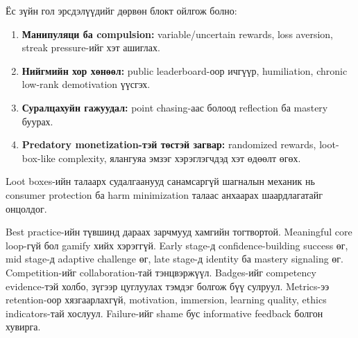 \begin{sloppy}
Ёс зүйн гол эрсдэлүүдийг дөрвөн блокт ойлгож болно:
\begin{enumerate}
  \item \textbf{Манипуляци ба compulsion:} variable/uncertain rewards, loss aversion, streak pressure-ийг хэт ашиглах.
  \item \textbf{Нийгмийн хор хөнөөл:} public leaderboard-оор ичгүүр, humiliation, chronic low-rank demotivation үүсгэх.
  \item \textbf{Суралцахуйн гажуудал:} point chasing-аас болоод reflection ба mastery буурах.
  \item \textbf{Predatory monetization-тэй төстэй загвар:} randomized rewards, loot-box-like complexity, ялангуяа эмзэг хэрэглэгчдэд хэт өдөөлт өгөх.
\end{enumerate}
Loot boxes-ийн талаарх судалгаанууд санамсаргүй шагналын механик нь consumer protection ба harm minimization талаас анхаарах шаардлагатайг онцолдог.

Best practice-ийн түвшинд дараах зарчмууд хамгийн тогтвортой. Meaningful core loop-гүй бол gamify хийх хэрэггүй. Early stage-д confidence-building success өг, mid stage-д adaptive challenge өг, late stage-д identity ба mastery signaling өг. Competition-ийг collaboration-тай тэнцвэржүүл. Badges-ийг competency evidence-тэй холбо, зүгээр цуглуулах тэмдэг болгож бүү сулруул. Metrics-ээ retention-оор хязгаарлахгүй, motivation, immersion, learning quality, ethics indicators-тай хослуул. Failure-ийг shame бус informative feedback болгон хувирга.


\end{sloppy}
